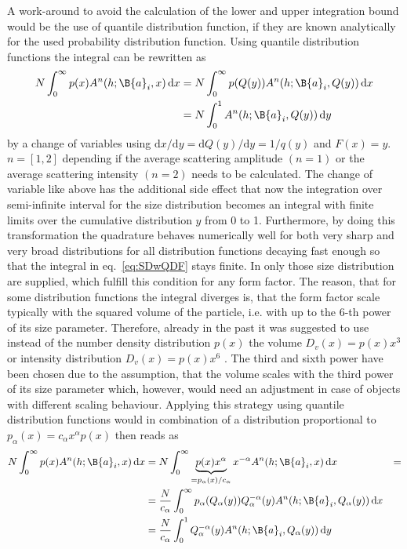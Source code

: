 A work-around to avoid the calculation of the lower and upper integration bound would be the use of quantile distribution function, if they are known analytically for the used probability distribution function. Using quantile distribution functions the integral can be rewritten as
\begin{align}\label{eq:SDwQDF}
  N \int_0^\infty p(x) A^n(h;\B{a}_i,x)\, \mathrm{d}x & = N \int_0^\infty p(Q(y)) A^n(h;\B{a}_i,Q(y)) \, \mathrm{d}x \\
   & = N \int_0^1 A^n(h;\B{a}_i,Q(y)) \, \mathrm{d}y
\end{align}
by a change of variables using $\mathrm{d}x/\mathrm{d}y=\mathrm{d}Q(y)/\mathrm{d}y=1/q(y)$ and $F(x)=y$. $n=[1,2]$ depending if the average scattering amplitude $(n=1)$ or the average scattering intensity $(n=2)$ needs to be calculated. The change of variable like above has the additional side effect that now the integration over semi-infinite interval for the size distribution becomes an integral with finite limits over the cumulative  distribution $y$ from  0  to  1. Furthermore, by doing this transformation the quadrature behaves numerically well for both very sharp and very broad distributions for all distribution functions decaying fast enough so that the integral in eq.\ \ref{eq:SDwQDF} stays finite. In \SASfit only those size distribution are supplied, which fulfill this condition for any form factor. The reason, that for some distribution functions  the integral diverges is, that the form factor scale typically with the squared volume of the particle, i.e. with up to the 6-th power of its size parameter. Therefore, already in the past it was suggested to use instead of the number density distribution $p(x)$ the volume $D_v(x)=p(x)x^3$ or intensity distribution $D_v(x)=p(x)x^6$ \cite{Glatter1980}. The third and sixth power have been chosen due to the assumption, that the volume scales with the third power of its size parameter which, however, would need an adjustment in case of objects with different scaling behaviour.
Applying this strategy using quantile distribution functions would in combination of a distribution proportional to $p_\alpha(x) = c_\alpha x^\alpha p(x)$ then reads as
\begin{align}\label{eq:intensity_alpha_quantile}
N  \int_0^\infty p(x) A^n(h;\B{a}_i,x)\, \mathrm{d}x & = N \int_0^\infty \underbrace{p(x) x^\alpha}_{=p_\alpha(x)/c_\alpha} x^{-\alpha} A^n(h;\B{a}_i,x)\, \mathrm{d}x & = \\
   &= \frac{N}{c_\alpha}\int_0^\infty p_\alpha(Q_\alpha(y)) Q^{-\alpha}_\alpha(y) A^n(h;\B{a}_i,Q_\alpha(y))\, \mathrm{d}x\\
   &= \frac{N}{c_\alpha} \int_0^1 Q^{-\alpha}_\alpha(y) A^n(h;\B{a}_i,Q_\alpha(y))\, \mathrm{d}y
\end{align}
